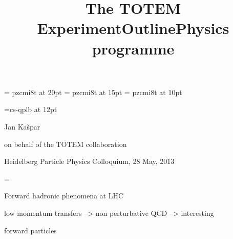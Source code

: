 


\iftrue
	\StdBackground
\else
	\SetBackground{fig/bg_prepare.pdf}
	\def\cYe{\cBlack}
	\def\cLRe{\cBlack}
	\def\cRe{\cBlack}
\fi

\font\ExtraTitleFont = pzcmi8t at 20pt
\font\TitleFont = pzcmi8t at 15pt
\font\ContextFont = pzcmi8t at 10pt


\def\Em#1{\em{\cLRe#1\cFg}}
\def\EM#1{{\cYe\TitleFont #1\cFg}}


\def\date{28 May, 2013}


\newpage %
\hbox{}\vfil
\title{\ExtraTitleFont The TOTEM Experiment}
\vfil
\font\NameFont=cs-qplb at 12pt
\centerline{\NameFont Jan Kašpar}
\centerline{on behalf of the TOTEM collaboration}
\vfil
{}
\vfil
\centerline{Heidelberg Particle Physics Colloquium, \date}
\vfil

{
\footline={}



\newpage %
\title{Outline}
}

\vfil


\vfil
\vfil

\newpage %
\hbox{}
\vfil
\title{Physics programme}



\newpage %
\title{}

Forward hadronic phenomena at LHC

\> low momentum transfers --> non perturbative QCD --> interesting

\> forward particles

